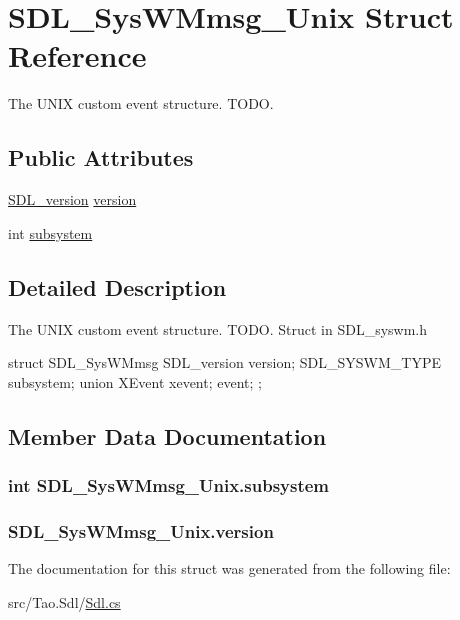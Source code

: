 \hypertarget{struct_s_d_l___sys_w_mmsg___unix}{
\section{SDL\_\-SysWMmsg\_\-Unix Struct Reference}
\label{struct_s_d_l___sys_w_mmsg___unix}
}


The UNIX custom event structure. TODO.  


\subsection*{Public Attributes}
\begin{DoxyCompactItemize}
\item 
\hyperlink{struct_s_d_l__version}{SDL\_\-version} \hyperlink{struct_s_d_l___sys_w_mmsg___unix_acf903b0c75268bf29c761d3c7f0a0ace}{version}
\item 
int \hyperlink{struct_s_d_l___sys_w_mmsg___unix_aa6da499d8a77199e966e0f03218f665c}{subsystem}
\end{DoxyCompactItemize}


\subsection{Detailed Description}
The UNIX custom event structure. TODO. Struct in SDL\_\-syswm.h 
\begin{DoxyCode}
            struct SDL_SysWMmsg {
                        SDL_version version;
                        SDL_SYSWM_TYPE subsystem;
                        union 
                        {
                        XEvent xevent;
                } event;
            };          
\end{DoxyCode}
  

\subsection{Member Data Documentation}
\hypertarget{struct_s_d_l___sys_w_mmsg___unix_aa6da499d8a77199e966e0f03218f665c}{
\subsubsection[{subsystem}]{\setlength{\rightskip}{0pt plus 5cm}int {\bf SDL\_\-SysWMmsg\_\-Unix.subsystem}}}
\label{struct_s_d_l___sys_w_mmsg___unix_aa6da499d8a77199e966e0f03218f665c}
\hypertarget{struct_s_d_l___sys_w_mmsg___unix_acf903b0c75268bf29c761d3c7f0a0ace}{
\subsubsection[{version}]{ {\bf SDL\_\-SysWMmsg\_\-Unix.version}}}
\label{struct_s_d_l___sys_w_mmsg___unix_acf903b0c75268bf29c761d3c7f0a0ace}


The documentation for this struct was generated from the following file:\begin{DoxyCompactItemize}
\item 
src/Tao.Sdl/\hyperlink{_sdl_8cs}{Sdl.cs}\end{DoxyCompactItemize}
